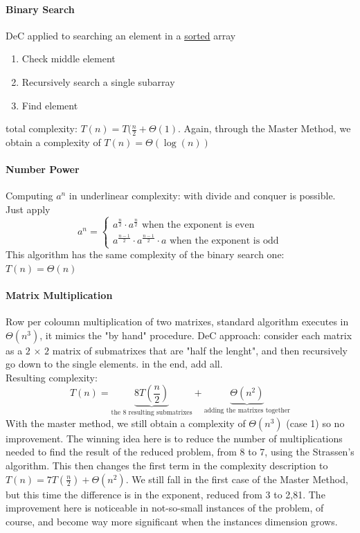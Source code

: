\documentclass{article}
\begin{document}
			\paragraph{Binary Search}
				DeC applied to searching an element in a \underline{sorted} array
				\begin{enumerate}
					\item Check middle element
					\item Recursively search a single subarray
					\item Find element
				\end{enumerate}
				total complexity: $T(n) = T(\frac{n}{2} + \Theta(1)$. Again, through the Master Method, we obtain a complexity of $T(n) = \Theta(\log(n))$

			\paragraph{Number Power}
				Computing $a^n$ in underlinear complexity: with divide and conquer is possible. Just apply
				\begin{equation}
					a^n = 
					\begin{cases}
						a^{\frac{n}{2}}\cdot a^{\frac{n}{2}} \text{ when the exponent is even}\\
						a^{\frac{n-1}{2}}\cdot a^{\frac{n-1}{2}} \cdot a \text{ when the exponent is odd}
					\end{cases}
				\end{equation}
				This algorithm has the same complexity of the binary search one: $T(n) = \Theta(n)$

			\paragraph{Matrix Multiplication}
				Row per coloumn multiplication of two matrixes, standard algorithm executes in $\Theta(n^3)$, it mimics the "by hand" procedure. DeC approach: consider each matrix as a $2\, \times\, 2$ matrix of submatrixes that are "half the lenght", and then recursively go down to the single elements. in the end, add all.\\
				Resulting complexity:
				\begin{equation}
					T(n) = \underbrace{8T(\frac{n}{2})}_{\text{the 8 resulting submatrixes}} + \underbrace{\Theta(n^2)}_{\text{adding the matrixes together}}
				\end{equation}
				With the master method, we still obtain a complexity of $\Theta(n^3)$ (case 1) so no improvement. The winning idea here is to reduce the number of multiplications needed to find the result of the reduced problem, from 8 to 7, using the Strassen's algorithm. This then changes the first term in the complexity description to $T(n) = 7T(\frac{n}{2}) + \Theta(n^2)$. We still fall in the first case of the Master Method, but this time the difference is in the exponent, reduced from 3 to 2,81. The improvement here is noticeable in not-so-small instances of the problem, of course, and become way more significant when the instances dimension grows.
\end{document}
